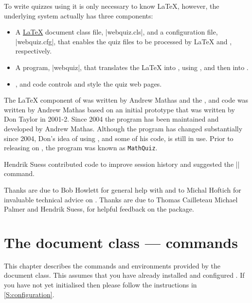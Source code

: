 \documentclass[svgnames]{article}
\newcommand\Ctan{\ctan[]{ctan}\xspace}
\begin{document}
      To write quizzes using \WebQuiz it is only necessary to know
      \LaTeX, however, the underlying \WebQuiz system actually has three
      components:
      \begin{itemize}
        \item A \href{https://www.latex-project.org/}{\LaTeX} document class
        file, \BashCode|webquiz.cls|, and a \TeXfht
        configuration file, \BashCode|webquiz.cfg|, that enables the
        quiz files to be processed by \LaTeX{} and \TeXfht, respectively.
        \item A \python program,
        \BashCode|webquiz|, that translates the
        \LaTeX{} into \XML, using \TeXfht, and then into \HTML.
        \item \CSS, \HTML and \Javascript code controls and style the
        quiz web pages.
      \end{itemize}

     The \LaTeX{} component of \WebQuiz{} was written by Andrew Mathas and
     the \python, \CSS and \Javascript code was written by Andrew Mathas
     based on an initial prototype that was written by Don Taylor in 2001-2.
     Since 2004 the program has been maintained and developed by Andrew
     Mathas. Although the program has changed substantially since 2004,
     Don's idea of using \TeXfht, and some of his code, is still
     in use. Prior to releasing \WebQuiz on \Ctan, the program was known
     as \texttt{MathQuiz}.

     Hendrik Suess contributed code to improve session history
     and suggested the \LatexCode|\qref| command.

     Thanks are due to Bob Howlett for general help with \CSS and to
     Michal Hoftich for invaluable technical advice on \TeXfht. Thanks
     are due to
        Thomas Cailleteau
        Michael Palmer and
        Hendrik Suess,
     for helpful feedback on the package.

   \section{The \WebQuiz document class ---  commands}
   \label{S:documentclass}

    This chapter describes the commands and environments provided by the
    \WebQuiz document class. This assumes that you have already installed
    and configured \WebQuiz. If you have not yet initialised \WebQuiz
    then please follow the instructions in \autoref{S:configuration}.
\end{document}

